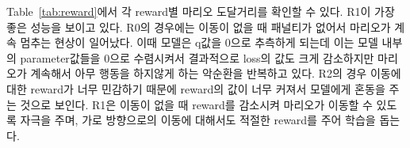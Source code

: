 Table~\ref{tab:reward}에서 각 reward별  마리오 도달거리를 확인할 수 있다.
R1이 가장 좋은 성능을 보이고 있다.
R0의 경우에는 이동이 없을 때 패널티가 없어서 마리오가 계속 멈추는 현상이 일어났다.
이때 모델은 q값을 0으로 추측하게 되는데 이는 모델 내부의 parameter값들을 0으로 수렴시켜서 결과적으로 loss의 값도 크게 감소하지만 마리오가 계속해서 아무 행동을 하지않게 하는 악순환을 반복하고 있다.
R2의 경우 이동에 대한 reward가 너무 민감하기 때문에 reward의 값이 너무 커져서 모델에게 혼동을 주는 것으로 보인다.
R1은 이동이 없을 때 reward를 감소시켜 마리오가 이동할 수 있도록 자극을 주며, 가로 방향으로의 이동에 대해서도 적절한 reward를 주어  학습을 돕는다.

